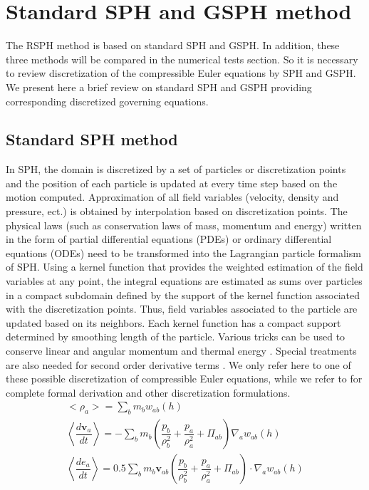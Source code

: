 \section{Standard SPH and GSPH method}
The RSPH method is based on standard SPH and GSPH. In addition, these three methods will be compared in the numerical tests section. So it is necessary to review discretization of the compressible Euler equations by SPH and GSPH. We present here a brief review on standard SPH and GSPH providing corresponding discretized governing equations.

\subsection{Standard SPH method}
In SPH, the domain is discretized by a set of particles or discretization points and the position of each particle is updated at every time step based on the motion computed. Approximation of all field variables (velocity, density and pressure, ect.) is obtained by interpolation based on discretization points. The physical laws (such as conservation laws of mass, momentum and energy) written in the form of partial differential equations (PDEs) or ordinary differential equations (ODEs) need to be transformed into the Lagrangian particle formalism of SPH. Using a kernel function that provides the weighted estimation of the field variables at any point, the integral equations are estimated as sums over particles in a compact subdomain defined by the support of the kernel function associated with the discretization points. Thus, field variables associated to the particle are updated based on its neighbors. Each kernel function has a compact support determined by smoothing length of the particle. Various tricks can be used to conserve linear and angular momentum and thermal energy \citep{monaghan1992smoothed}. Special treatments are also needed for second order derivative terms \citep{monaghan2005smoothed}. We only refer here to one of these possible discretization of compressible Euler equations, while we refer to \citet{ monaghan2005smoothed, liu2010smoothed, price2012smoothed} for complete formal derivation and other discretization formulations.
\begin{align}
<\rho_a> = \sum_b m_b w_{ab} \left(h\right) \label{eq:ns-sph-d} \\
\left\langle\dfrac{d \textbf{v}_a}{d t}\right\rangle = -\sum_b m_b \left(\dfrac{p_b}{\rho_b^2} + \dfrac{p_a}{\rho_a^2} + \Pi_{ab}\right) \nabla_a w_{a b}\left(h\right) \label{eq:ns-sph-v} \\
\left\langle\dfrac{d e_a}{d t}\right\rangle=
 0.5\sum_b m_b \textbf{v}_{a b}\left(\dfrac{p_b}{\rho_b^2} + \dfrac{p_a}{\rho_a^2} + \Pi_{ab}\right) \cdot \nabla_a w_{a b}\left(h\right) \label{eq:ns-sph-e}
\end{align}
